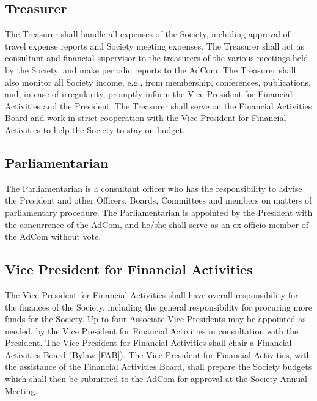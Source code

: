 \documentclass[10pt]{article}
\newcommand{\blref}[1]{Bylaw \ref{#1}}
\begin{document}
\subsection{Treasurer}

The Treasurer shall handle all expenses of the Society, including approval of travel expense reports and Society meeting expenses. The Treasurer shall act as consultant and financial supervisor to the treasurers of the various meetings held by the Society, and make periodic reports to the AdCom. The Treasurer shall also monitor all Society income, e.g., from membership, conferences, publications, and, in case of irregularity, promptly inform the Vice President for Financial Activities and the President. The Treasurer shall serve on the Financial Activities Board and work in strict cooperation with the Vice President for Financial Activities to help the Society to stay on budget.  


\subsection{Parliamentarian}

The Parliamentarian is a consultant officer who has the responsibility to advise the President and other Officers, Boards, Committees and members on matters of parliamentary procedure. The Parliamentarian is appointed by the President with the concurrence of the AdCom, and he/she shall serve as an ex officio member of the AdCom without vote.


\subsection{Vice President for Financial Activities}

The Vice President for Financial Activities shall have overall responsibility for the finances of the Society, including the general responsibility for procuring more funds for the Society. Up to four Associate Vice Presidents may be appointed as needed, by the Vice President for Financial Activities in consultation with the President. The Vice President for Financial Activities shall chair a Financial Activities Board (\blref{FAB}). The Vice President for Financial Activities, with the assistance of the Financial Activities Board, shall prepare the Society budgets which shall then be submitted to the AdCom for approval at the Society Annual Meeting.
\end{document}
